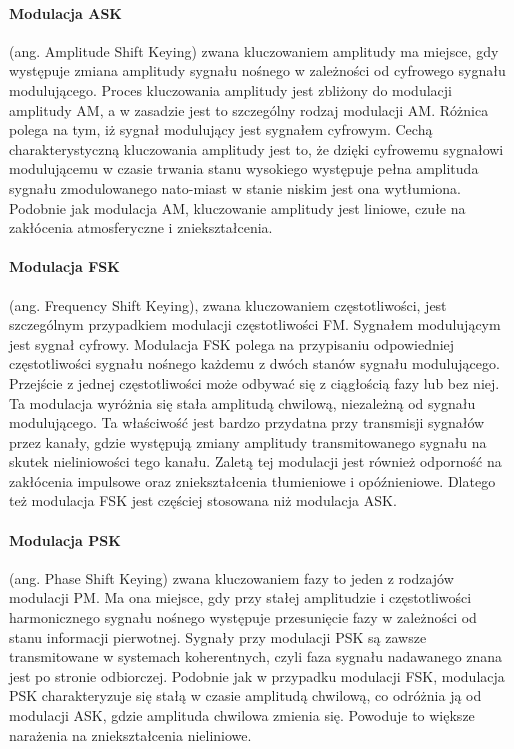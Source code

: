 \documentclass[a4paper,twoside]{report}
\begin{document}
\paragraph{Modulacja ASK} (ang. Amplitude Shift Keying) zwana kluczowaniem amplitudy ma miejsce, gdy występuje zmiana amplitudy sygnału nośnego w zależności od cyfrowego sygnału modulującego. Proces kluczowania amplitudy jest zbliżony do modulacji amplitudy AM, a w zasadzie jest to szczególny rodzaj modulacji AM. Różnica polega na tym, iż sygnał modulujący jest sygnałem cyfrowym. Cechą charakterystyczną kluczowania amplitudy jest to, że dzięki cyfrowemu sygnałowi modulującemu w czasie trwania stanu wysokiego występuje pełna amplituda sygnału zmodulowanego nato-miast w stanie niskim jest ona wytłumiona. Podobnie jak modulacja AM, kluczowanie amplitudy jest liniowe, czułe na zakłócenia atmosferyczne i zniekształcenia. 

\paragraph{Modulacja FSK}  (ang. Frequency Shift Keying), zwana kluczowaniem częstotliwości, jest szczególnym przypadkiem modulacji częstotliwości FM. Sygnałem modulującym jest sygnał cyfrowy. Modulacja FSK polega na przypisaniu odpowiedniej częstotliwości sygnału nośnego każdemu z dwóch stanów sygnału modulującego. Przejście z jednej częstotliwości może odbywać się z ciągłością fazy lub bez niej. Ta modulacja wyróżnia się stała amplitudą chwilową, niezależną od sygnału modulującego. Ta właściwość jest bardzo przydatna przy transmisji sygnałów przez kanały, gdzie występują zmiany amplitudy transmitowanego sygnału na skutek nieliniowości tego kanału. Zaletą tej modulacji jest również odporność na zakłócenia impulsowe oraz zniekształcenia tłumieniowe i opóźnieniowe. Dlatego też modulacja FSK jest częściej stosowana niż modulacja ASK. 


\paragraph{Modulacja PSK} (ang. Phase Shift Keying) zwana kluczowaniem fazy to jeden z rodzajów modulacji PM. Ma ona miejsce, gdy przy stałej amplitudzie i częstotliwości harmonicznego sygnału nośnego występuje przesunięcie fazy w zależności od stanu informacji pierwotnej. Sygnały przy modulacji PSK są zawsze transmitowane w systemach koherentnych, czyli faza sygnału nadawanego znana jest po stronie odbiorczej. Podobnie jak w przypadku modulacji FSK, modulacja PSK charakteryzuje się stałą w czasie amplitudą chwilową, co odróżnia ją od modulacji ASK, gdzie amplituda chwilowa zmienia się. Powoduje to większe narażenia na zniekształcenia nieliniowe. 
\end{document}
